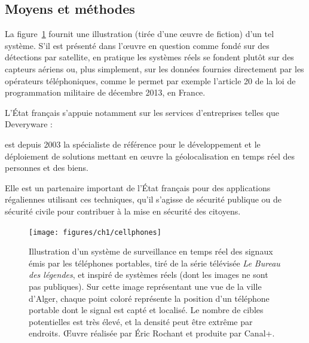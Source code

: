 	\FloatBarrier \subsection{Moyens et méthodes}
	La figure~\ref{fig:cellphones} fournit une illustration (tirée d'une œuvre de fiction) d'un tel système. S'il est présenté dans l'œuvre en question comme fondé sur des détections par satellite, en pratique les systèmes réels se fondent plutôt sur des capteurs aériens ou, plus simplement, sur les données fournies directement par les opérateurs téléphoniques, comme le permet par exemple l'article 20 de la loi de programmation militaire de décembre 2013, en France\footnotemark.
	
	
	L'État français s'appuie notamment sur les services d'entreprises telles que Deveryware :
	
	\begin{displayquote}
		[Celle-ci] est depuis 2003 la spécialiste de référence pour le développement et le déploiement de solutions mettant en œuvre la géolocalisation en temps réel des personnes et des biens.

		Elle est un partenaire important de l'État français pour des applications régaliennes utilisant ces techniques, qu'il s'agisse de sécurité publique ou de sécurité civile pour contribuer à la mise en sécurité des citoyens.\footnotemark
	\end{displayquote}
	
	
	\begin{figure}[!htbp]
		\centering
		\texttt{[image: figures/ch1/cellphones]}
		\caption[Surveillance des signaux de téléphones portables]{Illustration d'un système de surveillance en temps réel des signaux émis par les téléphones portables, tiré de la série télévisée \emph{Le Bureau des légendes}, et inspiré de systèmes réels (dont les images ne sont pas publiques). Sur cette image représentant une vue de la ville d'Alger, chaque point coloré représente la position d'un téléphone portable dont le signal est capté et localisé. Le nombre de cibles potentielles est très élevé, et la densité peut être extrême par endroits. \OE{}uvre réalisée par Éric Rochant et produite par Canal+.}
		\label{fig:cellphones}
	\end{figure}
	
